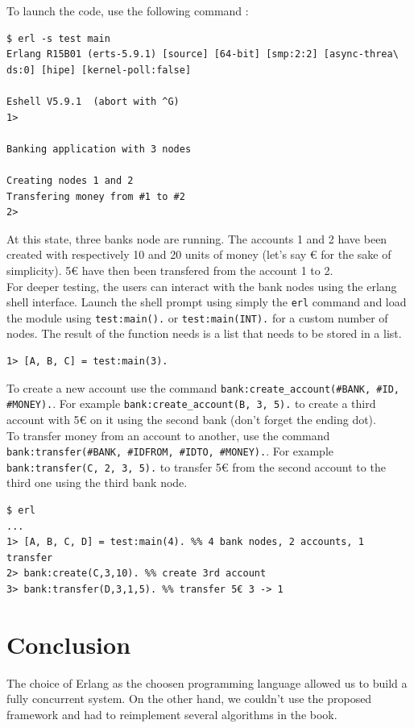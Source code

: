 \documentclass[11pt,english,a4paper]{article}
\begin{document}
To launch the code, use the following command :
\begin{verbatim}
$ erl -s test main
Erlang R15B01 (erts-5.9.1) [source] [64-bit] [smp:2:2] [async-threa\
ds:0] [hipe] [kernel-poll:false]

Eshell V5.9.1  (abort with ^G)
1>

Banking application with 3 nodes

Creating nodes 1 and 2
Transfering money from #1 to #2
2>
\end{verbatim}
At this state, three banks node are running.
The accounts 1 and 2 have been created with respectively 10 and 20 units of money (let's say € for the sake of simplicity).
5€ have then been transfered from the account 1 to 2.\\

For deeper testing, the users can interact with the bank nodes using the erlang shell interface.
Launch the shell prompt using simply the \texttt{erl} command and load the module using \texttt{test:main().} or \texttt{test:main(INT).} for a custom number of nodes.
The result of the function needs is a list that needs to be stored in a list.
\begin{verbatim}
1> [A, B, C] = test:main(3).
\end{verbatim}

To create a new account use the command \texttt{bank:create\_account(\#BANK, \#ID, \#MONEY).}.
For example \texttt{bank:create\_account(B, 3, 5).} to create a third account with 5€ on it using the second bank (don't forget the ending dot).\\

To transfer money from an account to another, use the command  \texttt{bank:transfer(\#BANK, \#IDFROM, \#IDTO, \#MONEY).}.
For example \texttt{bank:transfer(C, 2, 3, 5).} to transfer 5€ from the second account to the third one using the third bank node.

\begin{verbatim}
$ erl
...
1> [A, B, C, D] = test:main(4). %% 4 bank nodes, 2 accounts, 1 transfer
2> bank:create(C,3,10). %% create 3rd account
3> bank:transfer(D,3,1,5). %% transfer 5€ 3 -> 1
\end{verbatim}

\section{Conclusion}
The choice of Erlang as the choosen programming language allowed us to build a fully concurrent system.
On the other hand, we couldn't use the proposed framework and had to reimplement several algorithms in the book.
\end{document}
